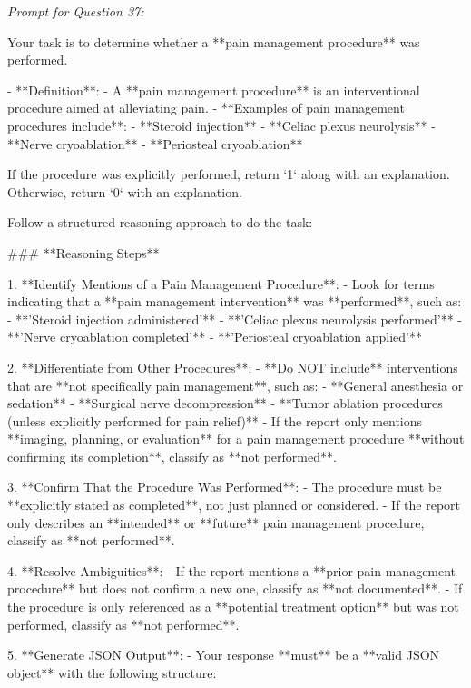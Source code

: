 \textit{\normalsize Prompt for Question  37:}
\begin{mdframed}[]
\normalsize

Your task is to determine whether a **pain management procedure** was performed.  

- **Definition**:  
  - A **pain management procedure** is an interventional procedure aimed at alleviating pain.  
  - **Examples of pain management procedures include**:  
    - **Steroid injection**  
    - **Celiac plexus neurolysis**  
    - **Nerve cryoablation**  
    - **Periosteal cryoablation**  

If the procedure was explicitly performed, return `1` along with an explanation. Otherwise, return `0` with an explanation.

Follow a structured reasoning approach to do the task:

### **Reasoning Steps**  

1. **Identify Mentions of a Pain Management Procedure**:  
   - Look for terms indicating that a **pain management intervention** was **performed**, such as:  
     - **'Steroid injection administered'**  
     - **'Celiac plexus neurolysis performed'**  
     - **'Nerve cryoablation completed'**  
     - **'Periosteal cryoablation applied'**  

2. **Differentiate from Other Procedures**:  
   - **Do NOT include** interventions that are **not specifically pain management**, such as:  
     - **General anesthesia or sedation**  
     - **Surgical nerve decompression**  
     - **Tumor ablation procedures (unless explicitly performed for pain relief)**  
   - If the report only mentions **imaging, planning, or evaluation** for a pain management procedure **without confirming its completion**, classify as **not performed**.  

3. **Confirm That the Procedure Was Performed**:  
   - The procedure must be **explicitly stated as completed**, not just planned or considered.  
   - If the report only describes an **intended** or **future** pain management procedure, classify as **not performed**.  

4. **Resolve Ambiguities**:  
   - If the report mentions a **prior pain management procedure** but does not confirm a new one, classify as **not documented**.  
   - If the procedure is only referenced as a **potential treatment option** but was not performed, classify as **not performed**.  

5. **Generate JSON Output**:  
   - Your response **must** be a **valid JSON object** with the following structure:  

\end{mdframed}

